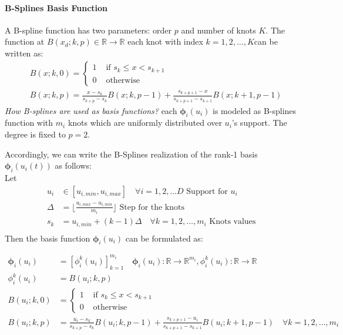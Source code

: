\documentclass[11pt]{article}
\begin{document}
    \paragraph{B-Splines Basis Function} A B-spline function has two parameters: order $p$ and number of knots $K$.
    The function at $B(x_d;k,p) \in \mathbb{R} \rightarrow \mathbb{R}$ each knot with index $k=1,2,\dots,K$can be written as:
    \begin{equation}
        \begin{aligned}
            & B(x;k,0)=
            \begin
            {cases}
                1 & \text { if } s_k \leq x<s_{k+1} \\ 0 & \text { otherwise }
            \end{cases} \\ & B(x;k,p)=\frac{x-s_k}{s_{k+p}-s_k} B(x;k,p-1)+\frac{s_{k+p+1}-x}{s_{k+p+1}-s_{k+1}} B(x;k+1, p-1)
        \end{aligned}\label{eq:b-splines-basis}
    \end{equation}
    \textit{How B-splines are used as basis functions?}
    each $\bm{\phi}_i(u_i)$ is modeled as B-splines function with $m_i$ knots which are uniformly distributed over $u_i$'s support.
    The degree is fixed to $p=2$\cite{novikov2022tensortrain}.


    Accordingly, we can write the B-Splines realization of the rank-1 basis $\bm{\phi}_i(u_i(t))$ as follows:\\
    Let
    \begin{align*}
        u_i &\in [u_{i,min},u_{i,max}] \quad \forall i=1,2,\dots D  \text{ Support for } u_i\\
        \Delta &=\lfloor \frac{u_{i,max}-u_{i,min}}{m_i} \rfloor \text{ Step for the knots }\\
        s_{k} &= u_{i,min} + (k-1)\Delta \quad \forall k=1,2,\dots,m_i \text{ Knots values }\\
    \end{align*}
    Then the basis function $\bm{\phi}_i(u_i)$ can be formulated as:

    \begin{equation}
        \label{eq:b-splines-basis-ftt}
        \begin{aligned}
            \bm{\phi}_i(u_i) &= [\phi_i^k(u_i)]_{k=1}^{m_i} \quad \bm{\phi}_i(u_i) : \mathbb{R} \rightarrow
            \mathbb{R}^{m_i},\phi_i^k(u_i) : \mathbb{R} \rightarrow \mathbb{R}\\
            \phi_i^k(u_i) &= B(u_i;k,p)\\
            B(u_i;k,0)&=
            \begin
            {cases}
                1 & \text { if } s_k \leq x<s_{k+1} \\ 0 & \text { otherwise }
            \end{cases} \\
            B(u_i;k,p)&=\frac{u_i-s_k}{s_{k+p}-s_k} B(u_i;k,p-1)+\frac{s_{k+p+1}-u_i}{s_{k+p+1}-s_{k+1}} B(u_i;k+1, p-1) \quad \forall k=1,2,\dots,m_i
        \end{aligned}
    \end{equation}
\end{document}
